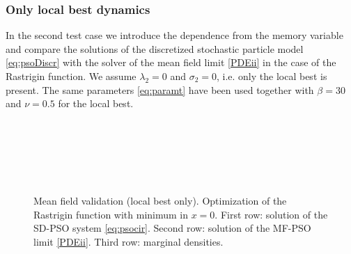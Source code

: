 \documentclass{ims9x6}
\begin{document}
\subsubsection{Only local best dynamics}
In the second test case we introduce the dependence from the memory variable and compare the solutions of the discretized stochastic particle model \eqref{eq:psoDiscr} with the solver of the mean field limit \eqref{PDEii} in the case of the Rastrigin function. We assume $\lambda_2=0$ and $\sigma_2 = 0$, i.e. only the local best is present. The same parameters \eqref{eq:paramt} have been used together with $\beta = 30$ and $\nu = 0.5$ for the local best.
\begin{figure}[tb]
\begin{minipage}{\linewidth}
\centering
{} 
\\
  \\
\ 
 \ 
 \\
\caption{Mean field validation (local best only). Optimization of the Rastrigin function with minimum in $x=0$. First row: solution of the SD-PSO system \eqref{eq:psocir}. Second row: solution of the MF-PSO limit \eqref{PDEii}. Third row: marginal densities.} 
\label{Fig4}
\end{minipage} \\
\end{figure}
\end{document}
